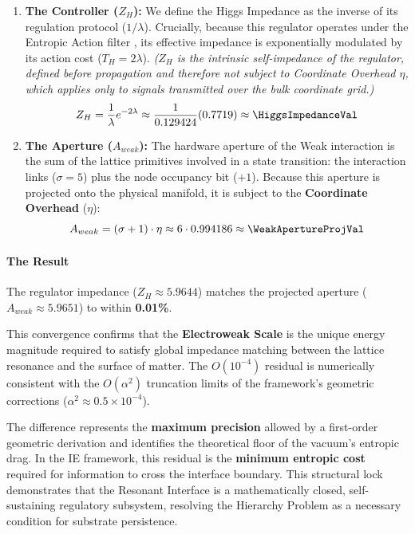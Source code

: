 \begin{enumerate}
    \item \textbf{The Controller ($Z_H$):} We define the Higgs Impedance as the inverse of its regulation protocol ($1/\lambda$). Crucially, because this regulator operates under the Entropic Action filter  \cite{meyer_ieaction_2026}, its effective impedance is exponentially modulated by its action cost ($T_H = 2\lambda$). \textit{($Z_H$ is the intrinsic self-impedance of the regulator, defined before propagation and therefore not subject to Coordinate Overhead $\eta$, which applies only to signals transmitted over the bulk coordinate grid.)}
    \begin{equation}
    Z_H = \frac{1}{\lambda} e^{-2\lambda} \approx \frac{1}{0.129424} (0.7719) \approx \mathbf{\HiggsImpedanceVal}
    \end{equation}

    \item \textbf{The Aperture ($A_{weak}$):} The hardware aperture of the Weak interaction is the sum of the lattice primitives involved in a state transition: the interaction links ($\sigma=5$) plus the node occupancy bit ($+1$). Because this aperture is projected onto the physical manifold, it is subject to the \textbf{Coordinate Overhead} ($\eta$):
    \begin{equation}
    A_{weak} = (\sigma + 1) \cdot \eta \approx 6 \cdot 0.994186 \approx \mathbf{\WeakApertureProjVal}
    \end{equation}
\end{enumerate}

\paragraph{The Result}
The regulator impedance ($Z_H \approx 5.9644$) matches the projected aperture ($A_{weak} \approx 5.9651$) to within \textbf{0.01\%}.

This convergence confirms that the \textbf{Electroweak Scale} is the unique energy magnitude required to satisfy global impedance matching between the lattice resonance and the surface of matter. The $O(10^{-4})$ residual is numerically consistent with the $O(\alpha^2)$ truncation limits of the framework's geometric corrections ($\alpha^2 \approx 0.5 \times 10^{-4}$).

The difference represents the \textbf{maximum precision} allowed by a first-order geometric derivation and identifies the theoretical floor of the vacuum's entropic drag. In the IE framework, this residual is the \textbf{minimum entropic cost} required for information to cross the interface boundary. This structural lock demonstrates that the Resonant Interface is a mathematically closed, self-sustaining regulatory subsystem, resolving the Hierarchy Problem as a necessary condition for substrate persistence.
